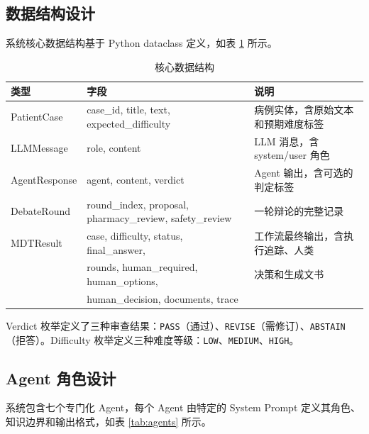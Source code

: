 \documentclass[11pt,a4paper]{ctexart}
\begin{document}
\subsection{数据结构设计}

系统核心数据结构基于 Python dataclass 定义，如表 \ref{tab:datastruct} 所示。

\begin{table}[H]
\centering
\caption{核心数据结构}
\label{tab:datastruct}
\small
\begin{tabular}{p{2.8cm} p{5.2cm} p{5.2cm}}
\toprule
\textbf{类型} & \textbf{字段} & \textbf{说明} \\
\midrule
PatientCase & case\_id, title, text, expected\_difficulty & 病例实体，含原始文本和预期难度标签 \\
LLMMessage & role, content & LLM 消息，含 system/user 角色 \\
AgentResponse & agent, content, verdict & Agent 输出，含可选的判定标签 \\
DebateRound & round\_index, proposal, pharmacy\_review, safety\_review & 一轮辩论的完整记录 \\
MDTResult & case, difficulty, status, final\_answer, & 工作流最终输出，含执行追踪、人类\\
 & rounds, human\_required, human\_options, & 决策和生成文书 \\
 & human\_decision, documents, trace & \\
\bottomrule
\end{tabular}
\end{table}

Verdict 枚举定义了三种审查结果：\texttt{PASS}（通过）、\texttt{REVISE}（需修订）、\texttt{ABSTAIN}（拒答）。Difficulty 枚举定义三种难度等级：\texttt{LOW}、\texttt{MEDIUM}、\texttt{HIGH}。

\subsection{Agent 角色设计}

系统包含七个专门化 Agent，每个 Agent 由特定的 System Prompt 定义其角色、知识边界和输出格式，如表 \ref{tab:agents} 所示。
\end{document}

